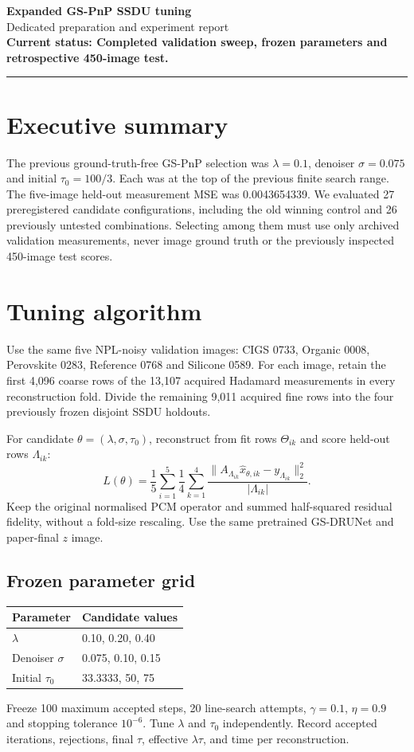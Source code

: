\documentclass[10pt,a4paper]{article}
\begin{document}
{\LARGE\bfseries Expanded GS-PnP SSDU tuning}\\[4pt]
{\large Dedicated preparation and experiment report}\\[4pt]
\textbf{Current status: Completed validation sweep, frozen parameters and retrospective 450-image test.}
\par\medskip\hrule
\section{Executive summary}
The previous ground-truth-free GS-PnP selection was
\(\lambda=0.1\), denoiser \(\sigma=0.075\) and
initial \(\tau_0=100/3\). Each was at the top of
the previous finite search range. The five-image held-out
measurement MSE was 0.0043654339.
We evaluated 27 preregistered candidate configurations, including the
old winning control and 26 previously untested combinations.
Selecting among them must use only archived validation
measurements, never image ground truth or the previously
inspected 450-image test scores.

\section{Tuning algorithm}
Use the same five NPL-noisy validation images:
CIGS 0733, Organic 0008, Perovskite 0283,
Reference 0768 and Silicone 0589.
For each image, retain the first 4,096 coarse rows
of the 13,107 acquired Hadamard measurements in
every reconstruction fold. Divide the remaining
9,011 acquired fine rows into the four previously
frozen disjoint SSDU holdouts.

For candidate \(\theta=(\lambda,\sigma,\tau_0)\),
reconstruct from fit rows \(\Theta_{ik}\)
and score held-out rows \(\Lambda_{ik}\):
\[
L(\theta)=\frac15\sum_{i=1}^{5}\frac14
\sum_{k=1}^{4}
\frac{\|A_{\Lambda_{ik}}\widehat{x}_{\theta,ik}
-y_{\Lambda_{ik}}\|_2^2}{|\Lambda_{ik}|}.
\]
Keep the original normalised PCM operator and summed
half-squared residual fidelity, without a fold-size
rescaling. Use the same pretrained GS-DRUNet and
paper-final \(z\) image.

\subsection*{Frozen parameter grid}
\begin{center}\begin{tabular}{ll}\toprule
Parameter & Candidate values\\\midrule
\(\lambda\) & 0.10, 0.20, 0.40\\
Denoiser \(\sigma\) & 0.075, 0.10, 0.15\\
Initial \(\tau_0\) & 33.3333, 50, 75\\\bottomrule
\end{tabular}\end{center}
Freeze 100 maximum accepted steps, 20 line-search attempts,
\(\gamma=0.1\), \(\eta=0.9\) and stopping
tolerance \(10^{-6}\). Tune \(\lambda\) and \(\tau_0\)
independently. Record accepted iterations,
rejections, final \(\tau\), effective
\(\lambda\tau\), and time per reconstruction.
\end{document}
